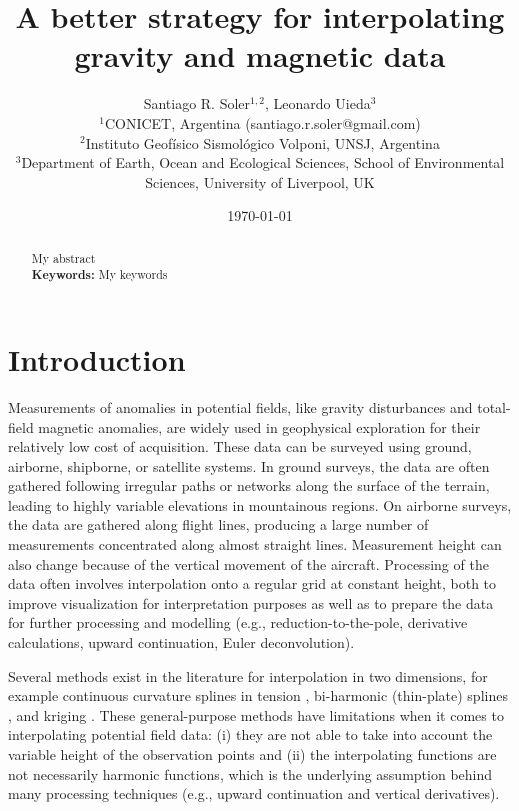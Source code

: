 \documentclass[twocolumn]{article}
\makeatletter
\newcommand{\Title}{
    A better strategy for interpolating gravity and magnetic data
}
\newcommand{\AuthorAffil}{
    {\large
        Santiago R. Soler$^{1,2}$,
        Leonardo Uieda$^{3}$
    }
    \\[0.4cm]
    {\small $^{1}$CONICET, Argentina (santiago.r.soler@gmail.com)} \\
    {\small $^{2}$Instituto Geofísico Sismológico Volponi, UNSJ, Argentina} \\
    {\small $^{3}$Department of Earth, Ocean and Ecological Sciences, School of Environmental Sciences, University of Liverpool, UK} \\
}
\makeatother
\begin{document}
\title{\Title}
\author{\AuthorAffil}
\date{
    \normalsize
    \today
}
\maketitle

\begin{abstract}
    My abstract
    \\[0.5cm]
    \textbf{Keywords:}
    My keywords
\end{abstract}


\section{Introduction}

Measurements of anomalies in potential fields, like gravity disturbances and
total-field magnetic anomalies, are widely used in geophysical exploration for
their relatively low cost of acquisition.
These data can be surveyed using ground, airborne, shipborne, or satellite
systems.
In ground surveys, the data are often gathered following irregular paths or
networks along the surface of the terrain, leading to highly variable
elevations in mountainous regions.
On airborne surveys, the data are gathered along flight lines, producing a
large number of measurements concentrated along almost straight lines.
Measurement height can also change because of the vertical movement of the
aircraft.
Processing of the data often involves interpolation onto a regular grid at
constant height, both to improve visualization for interpretation purposes as
well as to prepare the data for further processing and modelling (e.g.,
reduction-to-the-pole, derivative calculations, upward continuation, Euler
deconvolution).

Several methods exist in the literature for interpolation in two dimensions,
for example continuous curvature splines in tension \citep{smith1990},
bi-harmonic (thin-plate) splines \citep{sandwell1987}, and kriging \citep{hansen1993}.
These general-purpose methods have limitations when it comes to interpolating
potential field data:
(i) they are not able to take into account the variable height of the
observation points and
(ii) the interpolating functions are not necessarily harmonic functions, which
is the underlying assumption behind many processing techniques
(e.g., upward continuation and vertical derivatives).
\end{document}
